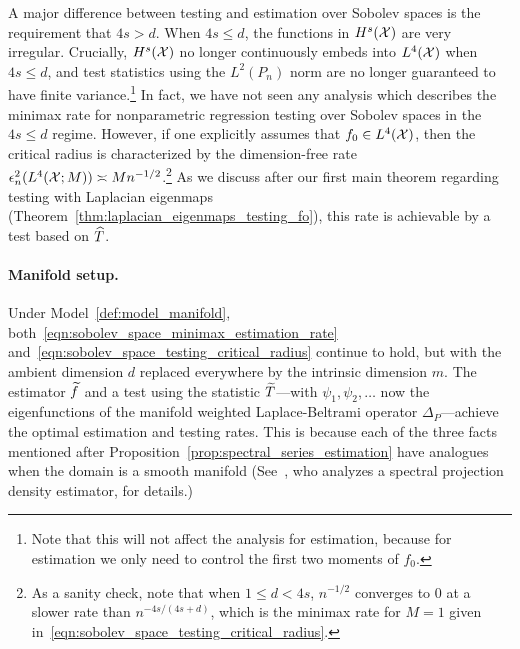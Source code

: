 A major difference between testing and estimation over Sobolev spaces is the requirement that $4s > d$. When $4s \leq d$, the functions in $H^s(\mathcal{X})$ are very irregular. Crucially, $H^s(\mathcal{X})$ no longer continuously embeds into $L^4(\mathcal{X})$ when $4s \leq d$, and test statistics using the $L^2(P_n)$ norm are no longer guaranteed to have finite variance.\footnote{Note that this will not affect the analysis for estimation, because for estimation we only need to control the first two moments of $f_0$.} In fact, we have not seen any analysis which describes the minimax rate for nonparametric regression testing over Sobolev spaces in the $4s \leq d$ regime. However, if one explicitly assumes that $f_0 \in L^4(\mathcal{X})$, then the critical radius is characterized by the dimension-free rate $\epsilon_n^2(L^4(\mathcal{X};M)) \asymp Mn^{-1/2}$.\footnote{As a sanity check, note that when $1 \leq d < 4s$, $n^{-1/2}$ converges to $0$ at a slower rate than $n^{-4s/(4s + d)}$, which is the minimax rate for $M = 1$ given in~\eqref{eqn:sobolev_space_testing_critical_radius}.} As we discuss after our first main theorem regarding testing with Laplacian eigenmaps (Theorem~\ref{thm:laplacian_eigenmaps_testing_fo}), this rate is achievable by a test based on $\widehat{T}$.

\paragraph{Manifold setup.}
Under Model~\ref{def:model_manifold}, both~\eqref{eqn:sobolev_space_minimax_estimation_rate} and~\eqref{eqn:sobolev_space_testing_critical_radius} continue to hold, but with the ambient dimension $d$ replaced everywhere by the intrinsic dimension $m$. The estimator $\widetilde{f}$ and a test using the statistic $\widetilde{T}$---with $\psi_1,\psi_2,\ldots$ now the eigenfunctions of the manifold weighted Laplace-Beltrami operator $\Delta_P$---achieve the optimal estimation and testing rates. This is because each of the three facts mentioned after Proposition~\ref{prop:spectral_series_estimation} have analogues when the domain is a smooth manifold (See~\citet{hendriks1990}, who analyzes a spectral projection density estimator, for details.)

